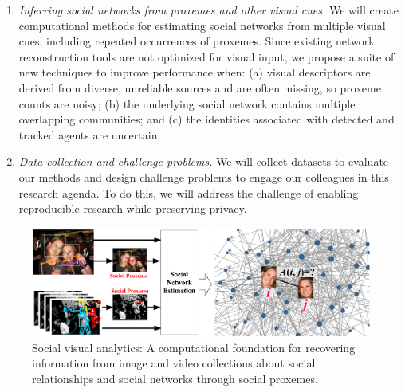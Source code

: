 \begin{enumerate}

\vspace{-0.1in}\item \emph{Inferring social networks from proxemes and other visual cues.} We will create computational methods for estimating social networks from multiple visual cues, including repeated occurrences of proxemes. Since existing network reconstruction tools are not optimized for visual input, we propose a suite of new techniques to improve performance when: (a) visual descriptors are derived from diverse, unreliable sources and are often missing, so proxeme counts are noisy; (b) the underlying social network contains multiple overlapping communities; and (c) the identities associated with detected and tracked agents are uncertain. 

\vspace{-0.1in}\item \emph{Data collection and challenge problems.} We will collect datasets to evaluate our methods and design challenge problems to engage our colleagues in this research agenda. To do this, we will address the challenge of enabling reproducible research while preserving privacy.

\end{enumerate}

\begin{figure}[t!]
\begin{center}
\includegraphics[width=\columnwidth]{intro_2014}
\end{center}
\vspace{-0.25in} \caption{\captionsize 
Social visual analytics: A computational foundation for recovering information from image and video collections about social relationships and social networks through social proxemes. \label{fig:intro}\afterfigspace}
\end{figure}

